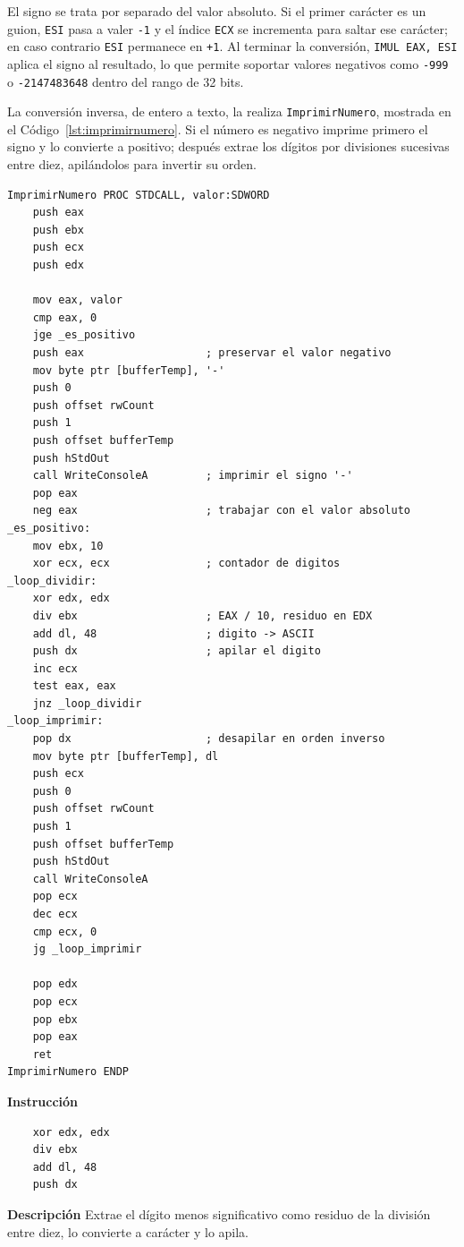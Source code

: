 \documentclass[a4paper,12pt]{article}
\begin{document}
El signo se trata por separado del valor absoluto. Si el primer carácter es un guion, \texttt{ESI} pasa a valer \texttt{-1} y el índice \texttt{ECX} se incrementa para saltar ese carácter; en caso contrario \texttt{ESI} permanece en \texttt{+1}. Al terminar la conversión, \texttt{IMUL EAX, ESI} aplica el signo al resultado, lo que permite soportar valores negativos como \texttt{-999} o \texttt{-2147483648} dentro del rango de 32 bits.

La conversión inversa, de entero a texto, la realiza \texttt{ImprimirNumero}, mostrada en el Código~\ref{lst:imprimirnumero}. Si el número es negativo imprime primero el signo y lo convierte a positivo; después extrae los dígitos por divisiones sucesivas entre diez, apilándolos para invertir su orden.

\begin{lstlisting}[style=assemblyStyle, caption={Procedimiento \texttt{ImprimirNumero}: conversión de entero a cadena con uso de la pila.}, label={lst:imprimirnumero}]
ImprimirNumero PROC STDCALL, valor:SDWORD
    push eax
    push ebx
    push ecx
    push edx

    mov eax, valor
    cmp eax, 0
    jge _es_positivo
    push eax                   ; preservar el valor negativo
    mov byte ptr [bufferTemp], '-'
    push 0
    push offset rwCount
    push 1
    push offset bufferTemp
    push hStdOut
    call WriteConsoleA         ; imprimir el signo '-'
    pop eax
    neg eax                    ; trabajar con el valor absoluto
_es_positivo:
    mov ebx, 10
    xor ecx, ecx               ; contador de digitos
_loop_dividir:
    xor edx, edx
    div ebx                    ; EAX / 10, residuo en EDX
    add dl, 48                 ; digito -> ASCII
    push dx                    ; apilar el digito
    inc ecx
    test eax, eax
    jnz _loop_dividir
_loop_imprimir:
    pop dx                     ; desapilar en orden inverso
    mov byte ptr [bufferTemp], dl
    push ecx
    push 0
    push offset rwCount
    push 1
    push offset bufferTemp
    push hStdOut
    call WriteConsoleA
    pop ecx
    dec ecx
    cmp ecx, 0
    jg _loop_imprimir

    pop edx
    pop ecx
    pop ebx
    pop eax
    ret
ImprimirNumero ENDP
\end{lstlisting}

\begin{instruccionbox}
\textbf{Instrucción}
\begin{lstlisting}
    xor edx, edx
    div ebx
    add dl, 48
    push dx
\end{lstlisting}
\textbf{Descripción}
Extrae el dígito menos significativo como residuo de la división entre diez, lo convierte a carácter y lo apila.
\end{instruccionbox}
\end{document}
